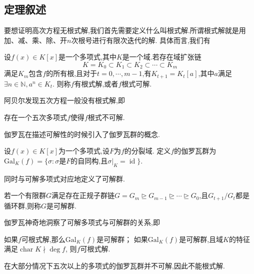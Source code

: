 \documentclass[main]{subfiles}
\newcommand{\gal}{\mathrm{Gal}}
\newcommand{\id}{\mathop{\mathrm{id}}}
\renewcommand{\char}{\mathop{\mathrm{char}}}
\begin{document}
\subsection{定理叙述}
要想证明高次方程无根式解,我们首先需要定义什么叫根式解.所谓根式解就是用加、减、乘、除、开\(n\)次根号进行有限次迭代的解.
具体而言,我们有
\begin{definition}\label{def:1}
	设\(f( x) \in K[ x]\)是一个多项式,其中\(K\)是一个域.若存在域扩张链
	\[
		K=K_0 \subset K_1 \subset K_2 \subset \cdots \subset K_m
	\]
	满足\(K_m\)包含\(f\)的所有根,且对于\(t=0,\cdots,m-1\),有\(K_{t+1}=K_t[ a]\),其中\(a\)满足\(\exists n \in \mathbb{N},a^n \in K_t\).
	则称\(f\)有根式解,或者\(f\)根式可解.
\end{definition}
阿贝尔发现五次方程一般没有根式解,即
\begin{theorem}\label{the:1}
	存在一个五次多项式\(f\)使得\(f\)根式不可解.
\end{theorem}
伽罗瓦在描述可解性的时候引入了伽罗瓦群的概念.
\begin{definition}\label{def:2}
	设\(f( x) \in K[ x]\)为一个多项式,设\(F\)为\(f\)的分裂域.
	定义\(f\)的伽罗瓦群为\(\gal_K( f)=\{ \sigma :\sigma \text{是}F \text{的自同构,且}\sigma|_K=\id\}\).
\end{definition}
同时与可解多项式对应地定义了可解群.
\begin{definition}\label{def:3}
	若一个有限群\(G\)满足存在正规子群链\(G=G_m \unrhd G_{m-1} \unrhd \cdots \unrhd G_0\),且\(G_{t+1} / G_t\)都是循环群,则称\(G\)是可解群.
\end{definition}
伽罗瓦神奇地洞察了可解多项式与可解群的关系,即
\begin{theorem}\label{the:2}
	如果\(f\)可根式解,那么\(\gal_K( f)\)是可解群；
	如果\(\gal_K( f)\)是可解群,且域\(K\)的特征满足\(\char K \nmid \deg f\), 则\(f\)可根式解.
\end{theorem}
在大部分情况下五次以上的多项式的伽罗瓦群并不可解,因此不能根式解.
\end{document}
